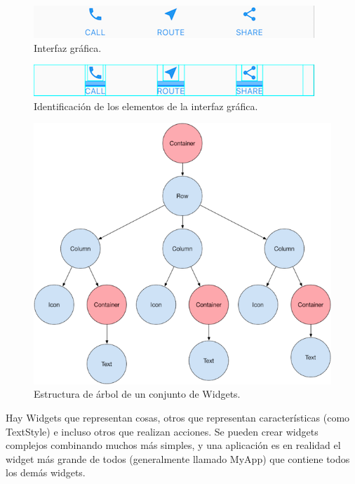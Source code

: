 \begin{figure}[!htb]
    \centering
    \includegraphics[scale=1]{TT/img/analisis/UIElementA.png}
    \caption{Interfaz gráfica.}
    \label{graphic:UIPart}
\end{figure}
\begin{figure}[!htb]
    \centering
    \includegraphics[scale=1]{TT/img/analisis/UIElementB.png}
    \caption{Identificación de los elementos de la interfaz gráfica.}
    \label{graphic:UIElements}
\end{figure}
\begin{figure}[!htb]
    \centering
    \includegraphics[scale=0.6]{TT/img/analisis/UIElementC.png}
    \caption{Estructura de árbol de un conjunto de Widgets.}
    \label{graphic:UITree}
\end{figure}
Hay Widgets que representan cosas, otros que representan características (como TextStyle) e incluso otros que realizan acciones. Se pueden crear widgets complejos combinando muchos más simples, y una aplicación es en realidad el widget más grande de todos (generalmente llamado MyApp) que contiene todos los demás widgets. 

